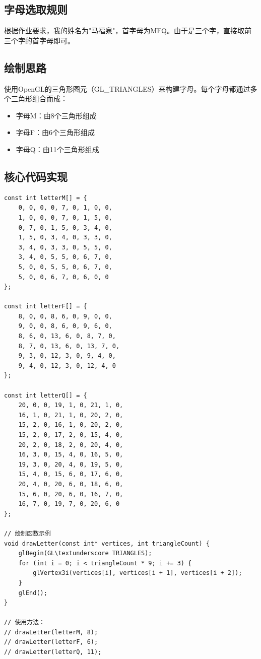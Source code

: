 \documentclass[a4paper]{article}
\begin{document}
\subsection{字母选取规则}

根据作业要求，我的姓名为"马福泉"，首字母为MFQ。由于是三个字，直接取前三个字的首字母即可。

\subsection{绘制思路}

使用OpenGL的三角形图元（GL\_TRIANGLES）来构建字母。每个字母都通过多个三角形组合而成：
\begin{itemize}
    \item 字母M：由8个三角形组成
    \item 字母F：由6个三角形组成  
    \item 字母Q：由11个三角形组成
\end{itemize}

\subsection{核心代码实现}

\begin{lstlisting}[caption={MFQ字母顶点定义与绘制（纵坐标为0）}]
const int letterM[] = {
    0, 0, 0, 0, 7, 0, 1, 0, 0,
    1, 0, 0, 0, 7, 0, 1, 5, 0,
    0, 7, 0, 1, 5, 0, 3, 4, 0,
    1, 5, 0, 3, 4, 0, 3, 3, 0,
    3, 4, 0, 3, 3, 0, 5, 5, 0,
    3, 4, 0, 5, 5, 0, 6, 7, 0,
    5, 0, 0, 5, 5, 0, 6, 7, 0,
    5, 0, 0, 6, 7, 0, 6, 0, 0
};

const int letterF[] = {
    8, 0, 0, 8, 6, 0, 9, 0, 0,
    9, 0, 0, 8, 6, 0, 9, 6, 0,
    8, 6, 0, 13, 6, 0, 8, 7, 0,
    8, 7, 0, 13, 6, 0, 13, 7, 0,
    9, 3, 0, 12, 3, 0, 9, 4, 0,
    9, 4, 0, 12, 3, 0, 12, 4, 0
};

const int letterQ[] = {
    20, 0, 0, 19, 1, 0, 21, 1, 0,
    16, 1, 0, 21, 1, 0, 20, 2, 0,
    15, 2, 0, 16, 1, 0, 20, 2, 0,
    15, 2, 0, 17, 2, 0, 15, 4, 0,
    20, 2, 0, 18, 2, 0, 20, 4, 0,
    16, 3, 0, 15, 4, 0, 16, 5, 0,
    19, 3, 0, 20, 4, 0, 19, 5, 0,
    15, 4, 0, 15, 6, 0, 17, 6, 0,
    20, 4, 0, 20, 6, 0, 18, 6, 0,
    15, 6, 0, 20, 6, 0, 16, 7, 0,
    16, 7, 0, 19, 7, 0, 20, 6, 0
};

// 绘制函数示例
void drawLetter(const int* vertices, int triangleCount) {
    glBegin(GL\textunderscore TRIANGLES);
    for (int i = 0; i < triangleCount * 9; i += 3) {
        glVertex3i(vertices[i], vertices[i + 1], vertices[i + 2]);
    }
    glEnd();
}

// 使用方法：
// drawLetter(letterM, 8);
// drawLetter(letterF, 6);
// drawLetter(letterQ, 11);
\end{lstlisting}
\end{document}
